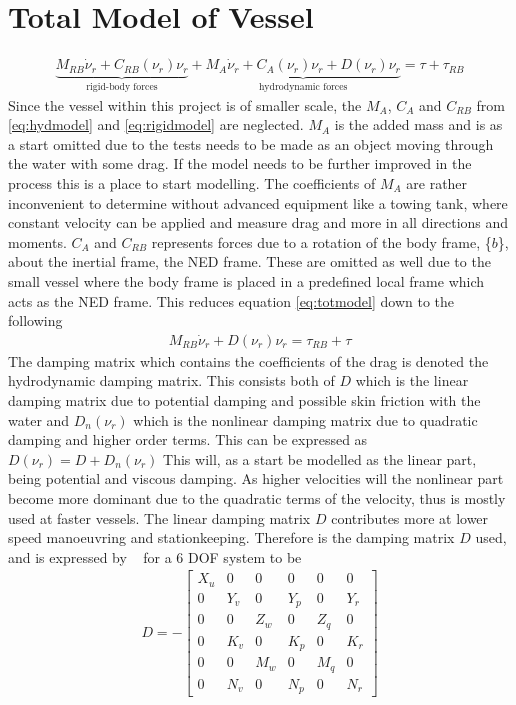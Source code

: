 \section{Total Model of Vessel}
\begin{align}
\underbrace{M_{RB} \dot \nu_r + C_{RB}(\nu_r)\nu_r}_{\text{rigid-body forces}} + \underbrace{M_A \dot \nu_r + C_A(\nu_r)\nu_r + D(\nu_r)\nu_r}_{\text{hydrodynamic forces}}  = \tau + \tau_{RB}
\label{eq:totmodel}
\end{align}
\citep{fossen}  Since the vessel within this project is of smaller scale, the $M_A$, $C_A$ and $C_{RB}$ from \ref{eq:hydmodel} and \ref{eq:rigidmodel} are neglected. $M_A$ is the added mass and is as a start omitted due to the tests needs to be made as an object moving through the water with some drag. If the model needs to be further improved in the process this is a place to start modelling. The coefficients of $M_A$ are rather inconvenient to determine without advanced equipment like a towing tank, where constant velocity can be applied and measure drag and more in all directions and moments. $C_A$ and $C_{RB}$ represents forces due to a rotation of the body frame, \{$b$\}, about the inertial frame, the NED frame. These are omitted as well due to the small vessel where the body frame is placed in a predefined local frame which acts as the NED frame. This reduces equation \ref{eq:totmodel} down to the following
\begin{align}
M_{RB} \dot \nu_r + D(\nu_r)\nu_r = \tau_{RB} + \tau
\label{eq:reducedmodel}
\end{align}
The damping matrix which contains the coefficients of the drag is denoted the hydrodynamic damping matrix. This consists both of $D$ which is the linear damping matrix due to potential damping and possible skin friction with the water and $D_n(\nu_r)$ which is the nonlinear damping matrix due to quadratic damping and higher order terms. This can be expressed as $D(\nu_r) = D + D_n(\nu_r)$ This will, as a start be modelled as the linear part, being potential and viscous damping. As higher velocities will the nonlinear part become more dominant due to the quadratic terms of the velocity, thus is mostly used at faster vessels. The linear damping matrix $D$ contributes more at lower speed manoeuvring and stationkeeping. Therefore is the damping matrix $D$ used, and is expressed by ~\citep{fossen} for a 6 \ac{DOF} system to be
\begin{align}
D =-
\begin{bmatrix}
X_u & 0 & 0 & 0 & 0 & 0\\
0 & Y_v & 0 & Y_p & 0 & Y_r\\
0 & 0 & Z_w & 0 & Z_q & 0\\
0 & K_v & 0 & K_p & 0 & K_r\\
0 & 0 & M_w & 0 & M_q & 0\\
0 & N_v & 0 & N_p & 0 & N_r
\end{bmatrix}
\end{align}

